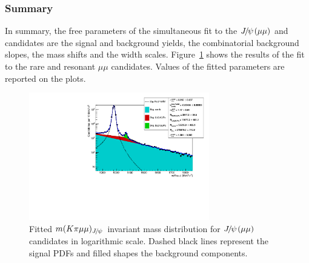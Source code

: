\subsubsection{Summary}

In summary, the free parameters of the simultaneous fit to the $\jpsi(\mu\mu)$ and \mm candidates are the signal and background yields, the combinatorial background slopes, the mass shifts and the width scales.
Figure~\ref{fig:mumu_data_fits} shows the results of the fit to the rare and resonant
$\mu\mu$ candidates. Values of the fitted parameters are reported on the plots.
%
\begin{figure}[bh!]
\centering
\includegraphics[width=0.7\textwidth]{RKst/figs/Fit/fit_MM/KstJPsMM_log.pdf}
\caption{Fitted $m(K\pi \mu\mu)_\jpsi$ invariant mass distribution for $\jpsi(\mu\mu)$ candidates
in logarithmic scale. Dashed black lines represent the signal PDFs and filled shapes the background components. }
\label{fig:mumu_data_fits}
\end{figure}
%
